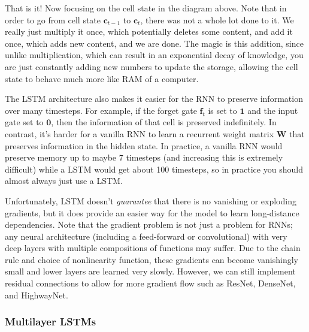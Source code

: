 \documentclass{article}
\theoremstyle{definition}
\theoremstyle{remark}
\theoremstyle{definition}
\begin{document}
That is it! Now focusing on the cell state in the diagram above. Note that in order to go from cell state $\mathbf{c}_{t-1}$ to $\mathbf{c}_t$, there was not a whole lot done to it. We really just multiply it once, which potentially deletes some content, and add it once, which adds new content, and we are done. The magic is this addition, since unlike multiplication, which can result in an exponential decay of knowledge, you are just constantly adding new numbers to update the storage, allowing the cell state to behave much more like RAM of a computer. 

The LSTM architecture also makes it easier for the RNN to preserve information over many timesteps. For example, if the forget gate $\mathbf{f}_t$ is set to $\mathbf{1}$ and the input gate set to $\mathbf{0}$, then the information of that cell is preserved indefinitely. In contrast, it's harder for a vanilla RNN to learn a recurrent weight matrix $\mathbf{W}$ that preserves information in the hidden state. In practice, a vanilla RNN would preserve memory up to maybe 7 timesteps (and increasing this is extremely difficult) while a LSTM would get about 100 timesteps, so in practice you should almost always just use a LSTM. 

Unfortunately, LSTM doesn't \textit{guarantee} that there is no vanishing or exploding gradients, but it does provide an easier way for the model to learn long-distance dependencies. Note that the gradient problem is not just a problem for RNNs; any neural architecture (including a feed-forward or convolutional) with very deep layers with multiple compositions of functions may suffer. Due to the chain rule and choice of nonlinearity function, these gradients can become vanishingly small and lower layers are learned very slowly. However, we can still implement residual connections to allow for more gradient flow such as ResNet, DenseNet, and HighwayNet. 



\subsubsection{Multilayer LSTMs}
\end{document}
